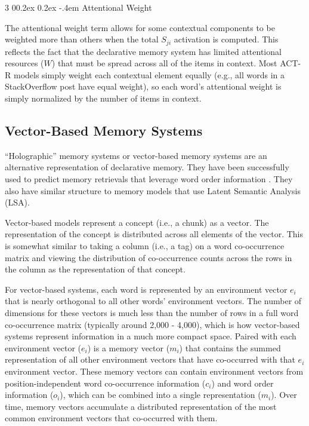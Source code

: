 \documentclass[man,floatsintext,donotrepeattitle]{apa6}
\makeatletter
\renewcommand{\subsubsection}{%
  \@startsection
  {subsubsection}%
  {3}%
  {\parindent}%
  {0\baselineskip \@plus 0.2ex \@minus 0.2ex}%
  {-.4em}%
  {\normalfont\normalsize\bfseries\addperi}}
\makeatother
\begin{document}
\subsubsection{Attentional Weight}

The attentional weight term allows for some contextual components to be weighted more than others when the total $S_{ji}$ activation is computed.
This reflects the fact that the declarative memory system has limited attentional resources ($W$) that must be spread across all of the items in context.
Most ACT-R models simply weight each contextual element equally (e.g., all words in a StackOverflow post have equal weight), so each word's attentional weight is simply normalized by the number of items in context.

\subsection{Vector-Based Memory Systems}

``Holographic'' memory systems \parencite{Plate1995} or vector-based memory systems are an alternative representation of declarative memory.
They have been successfully used to predict memory retrievals that leverage word order information \parencite{Jones2007}.
They also have similar structure to memory models that use Latent Semantic Analysis \parencite{Landauer1997} (LSA).

Vector-based models represent a concept (i.e., a chunk) as a vector.
The representation of the concept is distributed across all elements of the vector.
This is somewhat similar to taking a column (i.e., a tag) on a word co-occurrence matrix and viewing the distribution of co-occurrence counts across the rows in the column as the representation of that concept.

For vector-based systems, each word is represented by an environment vector $e_{i}$ that is nearly orthogonal to all other words' environment vectors.
The number of dimensions for these vectors is much less than the number of rows in a full word co-occurrence matrix (typically around 2,000 - 4,000), which is how vector-based systems represent information in a much more compact space.
Paired with each environment vector ($e_{i}$) is a memory vector ($m_{i}$) that contains the summed representation of all other environment vectors that have co-occurred with that $e_{i}$ environment vector.
These memory vectors can contain environment vectors from position-independent word co-occurrence information ($c_{i}$) and word order information ($o_{i}$), which can be combined into a single representation ($m_{i}$).
Over time, memory vectors accumulate a distributed representation of the most common environment vectors that co-occurred with them.
\end{document}
